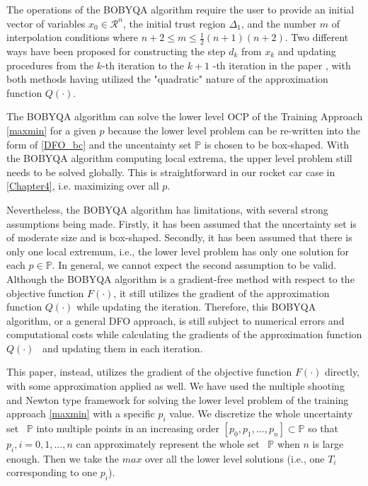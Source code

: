 \documentclass  [
  paper    = a4,
  BCOR     = 10mm,
  twoside,
  fontsize = 12pt,
  fleqn,
  toc      = bibnumbered,
  toc      = listofnumbered,
  numbers  = noendperiod,
  headings = normal,
  listof   = leveldown,
  version  = 3.03
]                                       {scrreprt}
\newcommand{\<}{\langle}
\renewcommand{\>}{\rangle}
\begin{document}
The operations of the BOBYQA algorithm require the user to provide an initial vector of variables $x_0 \in \mathcal{R}^n$, the initial trust region $\Delta_1$, and the number $m$ of interpolation conditions where $n+2 \leq m \leq \frac{1}{2}(n+1)(n+2)$. Two different ways have been proposed for constructing the step $d_k$ from $x_k$ and updating procedures from the $k$-th iteration to the $k+1$ -th iteration in the paper \cite{MicPow09}, with both methods having utilized the "quadratic" nature of the approximation function $Q(\cdot)$.

The BOBYQA algorithm can solve the lower level OCP of the Training Approach \ref{maxmin} for a given $p$ because the lower level problem can be re-written into the form of \ref{DFO_bc} and the uncentainty set $\mathbb{P}$ is chosen to be box-shaped. With the BOBYQA algorithm computing local extrema, the upper level problem still needs to be solved globally. This is straightforward in our rocket car case in \ref{Chapter4}, i.e. maximizing over all $p$.


Nevertheless, the BOBYQA algorithm has limitations, with several strong assumptions being made. Firstly, it has been assumed that the uncertainty set is of moderate size and is box-shaped. Secondly, it has been assumed that there is only one local extremum, i.e., the lower level problem has only one solution for each $p \in \mathbb{P}$. In general, we cannot expect the second assumption to be valid. Although the BOBYQA algorithm is a gradient-free method with respect to the objective function $F(\cdot)$, it still utilizes the gradient of the approximation function $Q(\cdot)$ while updating the iteration. Therefore, this BOBYQA algorithm, or a general DFO approach, is still subject to numerical errors and computational costs while calculating the gradients of the approximation function $Q(\cdot)$  and updating them in each iteration.



This paper, instead, utilizes the gradient of the objective function $F(\cdot)$ directly, with some approximation applied as well. We have used the multiple shooting and Newton type framework for solving the lower level problem of the training approach \ref{maxmin} with a specific $p_i$ value. We discretize the whole uncertainty set  $\mathbb{P}$ into multiple points in an increasing order $[p_0, p_1, ..., p_n] \subset \mathbb{P}$ so that $p_i, i =0, 1, ..., n$ can approximately represent the whole set  $\mathbb{P}$ when $n$ is large enough. Then we take the $max$ over all the lower level solutions (i.e., one $T_i$ corresponding to one $p_i$).
\end{document}
